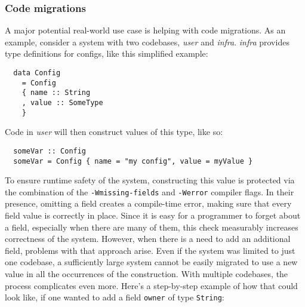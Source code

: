 \documentclass[en]{pracamgr}
\begin{document}
\subsubsection{Code migrations}
\newcommand{\user}{\textit{user}}
\newcommand{\infra}{\textit{infra}}
A major potential real-world use case is helping with code migrations.
As an example, consider a system with two codebases, \user{} and \infra{}. 
\infra{} provides type definitions for configs, like this simplified example:\\
\begin{minipage}{\linewidth}
\begin{lstlisting}
  data Config 
    = Config
    { name :: String
    , value :: SomeType
    }
\end{lstlisting}
\end{minipage}
Code in \user{} will then construct values of this type, like so:\\
\begin{minipage}{\linewidth}
\begin{lstlisting}
  someVar :: Config
  someVar = Config { name = "my config", value = myValue }
\end{lstlisting}
\end{minipage}
To ensure runtime safety of the system, constructing this value is protected via the combination of the 
\texttt{-Wmissing-fields} and \texttt{-Werror} compiler flags. 
In their presence, omitting a field creates a compile-time error, making sure that every field value is correctly in place.
Since it is easy for a programmer to forget about a field, especially when there are many of them, this check
measurably increases correctness of the system. 
However, when there is a need to add an additional field, problems with that approach arise. 
Even if the system was limited to just one codebase, a sufficiently large system cannot be easily migrated to use a new value
in all the occurrences of the construction. With multiple codebases, the process complicates even more. Here's a step-by-step
example of how that could look like, if one wanted to add a field \texttt{owner} of type \texttt{String}:
\newcommand{\defaultconf}{\texttt{defaultConfig}}
\newcommand{\conf}{\texttt{Config}}
\end{document}
